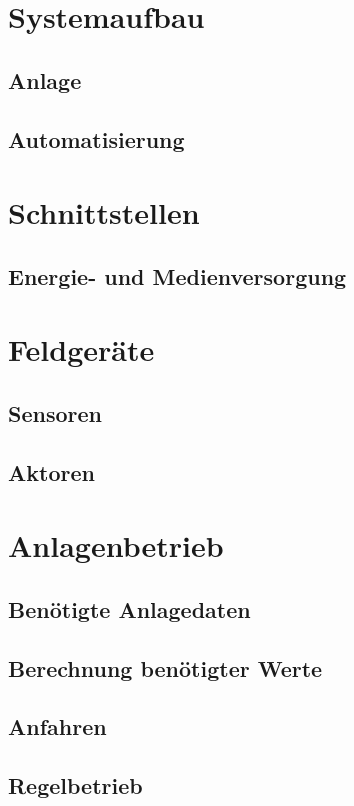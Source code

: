 \chapter{Systemaufbau}

\section{Anlage}

\section{Automatisierung}

\chapter{Schnittstellen}
\section{Energie- und Medienversorgung}

\chapter{Feldgeräte}

\section{Sensoren}

\section{Aktoren}

\chapter{Anlagenbetrieb}
\section{Benötigte Anlagedaten}
\section{Berechnung benötigter Werte}
\section{Anfahren}
\label{anfahren}
\section{Regelbetrieb}

